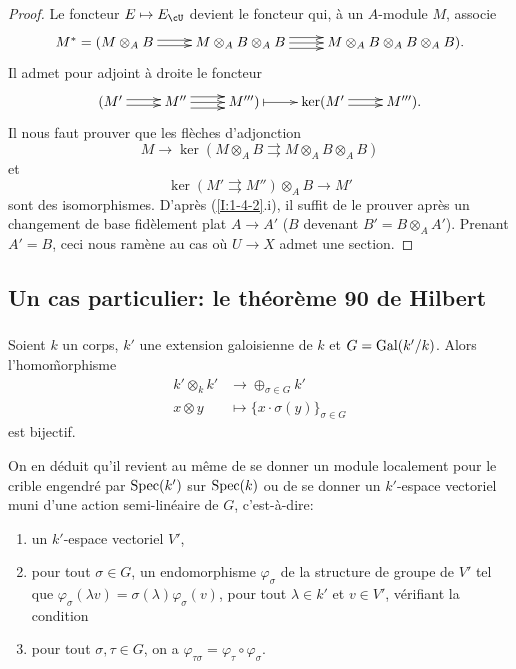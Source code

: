 \begin{proof}
Le foncteur $E\mapsto E_\cU$ devient le foncteur qui, à un $A$-module $M$, 
associe 
\[\xymatrix{
  M^* = (M\otimes_A B \ar@<2pt>[r] \ar@<-2pt>[r] 
    & M\otimes_A B\otimes_A B \ar@<-4pt>[r] \ar[r] \ar@<4pt>[r] 
    & M\otimes_A B\otimes_A B\otimes_A B)\text{.}
}\]
Il admet pour adjoint à droite le foncteur
\[\xymatrix{
  (M' \ar@<2pt>[r] \ar@<-2pt>[r] 
    & M'' \ar@<-4pt>[r] \ar[r] \ar@<4pt>[r]
    & M''') \ar@{|->}[r] 
    & \ker(M' \ar@<2pt>[r] \ar@<-2pt>[r] 
    & M''')\text{.}
}\]
Il nous faut prouver que les flèches d'adjonction 
\[
  M \to\ker(M\otimes_A B\rightrightarrows M\otimes_A B\otimes_A B)
\]
et
\[
  \ker(M'\rightrightarrows M'')\otimes_A B \to M'
\]
sont des isomorphismes. D'après (\ref{I:1-4-2}.i), il suffit de le prouver 
après un changement de base fidèlement plat $A\to A'$ ($B$ devenant 
$B'=B\otimes_A A'$). Prenant $A'=B$, ceci nous ramène au cas où $U\to X$ 
admet une section. 
\end{proof}










\subsection{Un cas particulier: le théorème 90 de Hilbert}\label{I:1-5}





\subsubsection{}\label{I:1-5-1}

Soient $k$ un corps, $k'$ une extension galoisienne de $k$ et $G=\operatorname{Gal}(k'/k)$. 
Alors l'homo\~morphisme 
\begin{align*}
  k'\otimes_k k' &\to \oplus_{\sigma\in G} k' \\
  x\otimes y     &\mapsto \{x\cdot \sigma(y)\}_{\sigma\in G}
\end{align*}
est bijectif. 

On en déduit qu'il revient au même de se donner un module localement pour 
le crible engendré par $\operatorname{Spec}(k')$ sur $\operatorname{Spec}(k)$ ou de se donner un 
$k'$-espace vectoriel muni d'une action semi-linéaire de $G$, c'est-à-dire: 
\begin{enumerate}[\indent a)]
  \item un $k'$-espace vectoriel $V'$,
  \item pour tout $\sigma\in G$, un endomorphisme $\varphi_\sigma$ de la 
    structure de groupe de $V'$ tel que 
    $\varphi_\sigma(\lambda v) = \sigma(\lambda) \varphi_\sigma(v)$, pour 
    tout $\lambda\in k'$ et $v\in V'$, vérifiant la condition
  \item pour tout $\sigma,\tau\in G$, on a 
    $\varphi_{\tau\sigma} = \varphi_\tau\circ\varphi_\sigma$. 
\end{enumerate}

